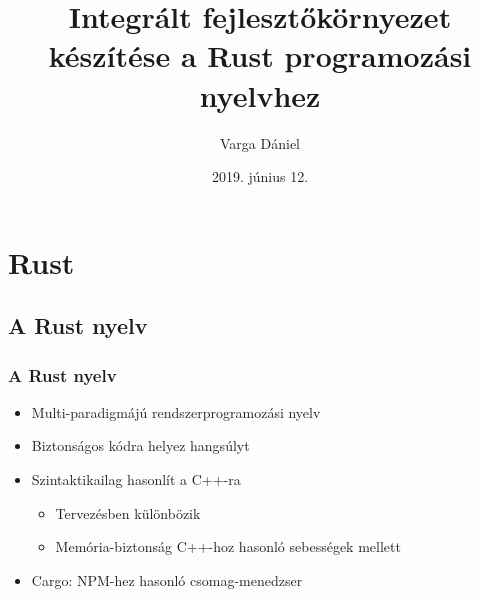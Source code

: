 \documentclass{beamer}
\title[IDE készítése a Rust-hoz]{Integrált fejlesztőkörnyezet készítése a Rust programozási nyelvhez}
\author{Varga Dániel}
\institute{Miskolci Egyetem}
\date{2019. június 12.}
\begin{document}
    \frame{\titlepage}

    \section{Rust}

    \subsection{A Rust nyelv}

    \begin{frame}[fragile]
        \frametitle{A Rust nyelv}

        \begin{itemize}
            \item Multi-paradigmájú rendszerprogramozási nyelv
            \item Biztonságos kódra helyez hangsúlyt
            \item Szintaktikailag hasonlít a C++-ra \begin{itemize}
                \item Tervezésben különbözik
                \item Memória-biztonság C++-hoz hasonló sebességek mellett
            \end{itemize}
            \item Cargo: NPM-hez hasonló csomag-menedzser
        \end{itemize}

    \end{frame}
\end{document}
